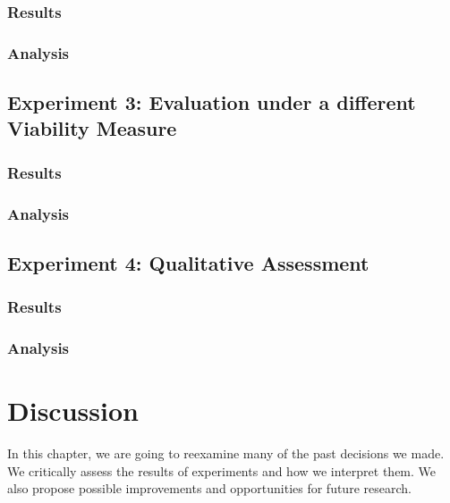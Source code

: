 \documentclass[12pt,a4paper]{report}
\begin{document}
\subsection{Results}


\subsection{Analysis}




\section{Experiment 3: Evaluation under a different Viability Measure}
\label{sec:experiment3}
\subsection{Results}

\subsection{Analysis}


\section{Experiment 4: Qualitative Assessment}
\label{sec:experiment4}
\subsection{Results}

\subsection{Analysis}



\chapter{Discussion}
\label{ch:discussion}
In this chapter, we are going to reexamine many of the past decisions we made. We critically assess the results of experiments and how we interpret them. We also propose possible improvements and opportunities for future research.
\end{document}
